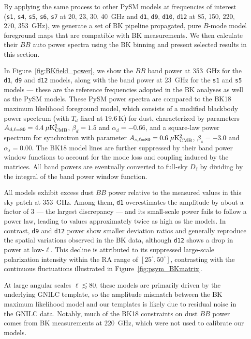 \documentclass[twocolumn]{aastex631}
\begin{document}
By applying the same process to other PySM models at frequencies of interest (\texttt{s1}, \texttt{s4}, \texttt{s5}, \texttt{s6}, \texttt{s7} at 20, 23, 30, 40~GHz and \texttt{d1}, \texttt{d9}, \texttt{d10}, \texttt{d12} at 85, 150, 220, 270, 353~GHz), we generate a set of BK pipeline propagated, pure $B$-mode model foreground maps that are compatible with BK measurements. We then calculate their $BB$ auto power spectra using the BK binning and present selected results in this section. 

In Figure~\ref{fig:BKfield_power}, we show the $BB$ band power at 353~GHz for the \texttt{d1}, \texttt{d9} and \texttt{d12} models, along with the band power at 23~GHz for the \texttt{s1} and \texttt{s5} models --- these are the reference frequencies adopted in the BK analyses as well as the PySM models. These PySM power spectra are compared to the BK18 maximum likelihood foreground model, which consists of a modified blackbody power spectrum (with $T_d$ fixed at $19.6~\text{K}$) for dust, characterized by parameters $A_{d,\ell=80} = 4.4 \; \mu\rm{K^2_{CMB}}$, $\beta_d = 1.5$ and $\alpha_d = -0.66$, and a square-law power spectrum for synchrotron with parameter $A_{s,\ell=80} = 0.6 \; \mu\rm{K^2_{CMB}}$, $\beta_s = -3.0$ and $\alpha_s = 0.00$. The BK18 model lines are further suppressed by their band power window functions to account for the mode loss and coupling induced by the matrices. All band powers are eventually converted to full-sky $D_\ell$ by dividing by the integral of the band power window function.

All models exhibit excess dust $BB$ power relative to the measured values in this sky patch at 353~GHz. Among them, \texttt{d1} overestimates the amplitude by about a factor of 3 --- the largest discrepancy --- and its small-scale power fails to follow a power law, leading to values approximately twice as high as the models. In contrast, \texttt{d9} and \texttt{d12} power show smaller deviation ratios and generally reproduce the spatial variations observed in the BK data, although \texttt{d12} shows a drop in power at low-$\ell$. This decline is attributed to its suppressed large-scale polarization intensity within the RA range of $[25^{\circ}, 50^{\circ}]$, contrasting with the continuous fluctuations illustrated in Figure~\ref{fig:psym_BKmatrix}. 

At large angular scales $\ell \lesssim 80$, these models are primarily driven by the underlying GNILC template, so the amplitude mismatch between the BK maximum likelihood model and our templates is likely due to residual noise in the GNILC data. Notably, much of the BK18 constraints on dust $BB$ power comes from BK measurements at 220~GHz, which were not used to calibrate our models.
\end{document}
